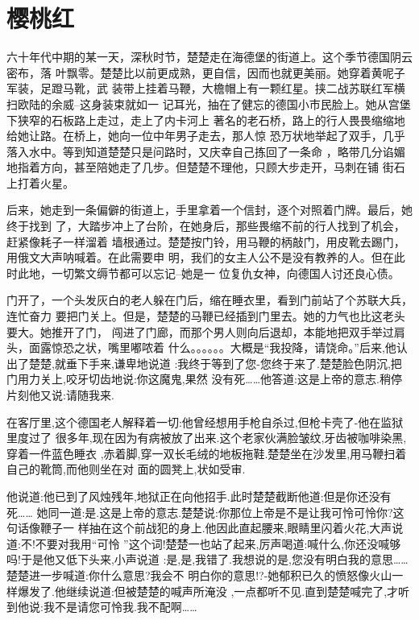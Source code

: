 \chapter{樱桃红}

六十年代中期的某一天，深秋时节，楚楚走在海德堡的街道上。这个季节德国阴云密布，落
叶飘零。楚楚比以前更成熟，更自信，因而也就更美丽。她穿着黄呢子军装，足蹬马靴，武
装带上挂着马鞭，大檐帽上有一颗红星。挟二战苏联红军横扫欧陆的余威--这身装束就如一
记耳光，抽在了健忘的德国小市民脸上。她从宫堡下狭窄的石板路上走过，走上了内卡河上
著名的老石桥，路上的行人畏畏缩缩地给她让路。在桥上，她向一位中年男子走去，那人惊
恐万状地举起了双手，几乎落入水中。等到知道楚楚只是问路时，又庆幸自己拣回了一条命
，略带几分谄媚地指着方向，甚至陪她走了几步。但楚楚不理他，只顾大步走开，马刺在铺
街石上打着火星。

后来，她走到一条偏僻的街道上，手里拿着一个信封，逐个对照着门牌。最后，她终于找到
了，大踏步冲上了台阶，在她身后，那些畏缩不前的行人找到了机会，赶紧像耗子一样溜着
墙根通过。楚楚按门铃，用马鞭的柄敲门，用皮靴去踢门，用俄文大声呐喊着。在此需要申
明，我们的女主人公不是没有教养的人。但在此时此地，一切繁文缛节都可以忘记--她是一
位复仇女神，向德国人讨还良心债。

门开了，一个头发灰白的老人躲在门后，缩在睡衣里，看到门前站了个苏联大兵，连忙奋力
要把门关上。但是，楚楚的马鞭已经插到门里去。她的力气也比这老头要大。她推开了门，
闯进了门廊，而那个男人则向后退却，本能地把双手举过肩头，面露惊恐之状，嘴里嘟哝着
什么。。。。。。大概是“我投降，请饶命。”后来,他认出了楚楚,就垂下手来,谦卑地说道
:我终于等到了您-您终于来了.楚楚脸色阴沉,把门用力关上,咬牙切齿地说:你这魔鬼,果然
没有死……他答道:这是上帝的意志.稍停片刻他又说:请随我来.

在客厅里,这个德国老人解释着一切:他曾经想用手枪自杀过,但枪卡壳了-他在监狱里度过了
很多年,现在因为有病被放了出来.这个老家伙满脸皱纹,牙齿被咖啡染黑,穿着一件蓝色睡衣
,赤着脚,穿一双长毛绒的地板拖鞋.楚楚坐在沙发里,用马鞭扫着自己的靴筒,而他则坐在对
面的圆凳上,状如受审.

他说道:他已到了风烛残年,地狱正在向他招手.此时楚楚截断他道:但是你还没有死……
她同一道:是.这是上帝的意志.楚楚说:你那位上帝是不是让我可怜可怜你?这句话像鞭子一
样抽在这个前战犯的身上.他因此直起腰来,眼睛里闪着火花,大声说道:不!不要对我用“可怜
”这个词!楚楚一也站了起来,厉声喝道:喊什么,你还没喊够吗!于是他又低下头来,小声说道
:是,是,我错了.我想说的是,您没有明白我的意思……楚楚进一步喊道:你什么意思?我会不
明白你的意思!?-她郁积已久的愤怒像火山一样爆发了.他继续说道:但被楚楚的喊声所淹没
,一点都听不见.直到楚楚喊完了,才听到他说:我不是请您可怜我.我不配啊…… 

